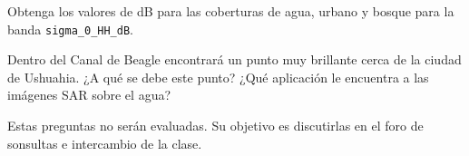 \begin{que}
    Obtenga los valores de dB para las coberturas de agua, urbano y bosque para la banda \texttt{sigma\_0\_HH\_dB}.
\end{que}

\begin{que}
    Dentro del Canal de Beagle encontrará un punto muy brillante cerca de la ciudad de Ushuahia. ¿A qué se debe este punto? ¿Qué aplicación le encuentra a las imágenes SAR sobre el agua?
\end{que}

Estas preguntas no serán evaluadas. Su objetivo es discutirlas en el foro de sonsultas e intercambio de la clase.
